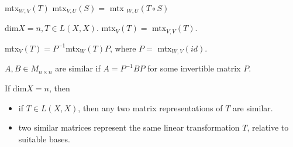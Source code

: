 \documentclass[11pt]{article} %
\begin{document}
mtx$_{W,V} (T) $ mtx$_{V,U}(S) = $ mtx $_{W,U}(T\circ S)$

dim$X = n, T \in L(X,X)$. mtx$_V (T) = $ mtx$_{V,V}(T)$.

mtx$_{V}(T) = P^{-1} $mtx$_{W} (T) P$, where $P = $ mtx$_{W,V}(id)$.

$A,B \in M_{n \times n}$ are similar if $A = P^{-1}BP$ for some invertible matrix $P$.

If dim$X = n$, then
\begin{itemize}
\item if $T \in L(X,X)$, then any two matrix representations of $T$ are similar.
\item two similar matrices represent the same linear transformation $T$, relative to suitable bases.
\end{itemize}
\end{document}
